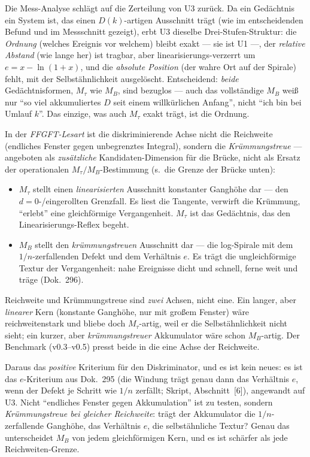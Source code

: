 Die Mess-Analyse schlägt auf die Zerteilung von U3 zurück. Da ein Gedächtnis ein System
ist, das einen $D(k)$-artigen Ausschnitt trägt (wie im entscheidenden Befund und im
Messschnitt gezeigt), erbt U3 dieselbe Drei-Stufen-Struktur: die \emph{Ordnung} (welches
Ereignis vor welchem) bleibt exakt --- sie ist U1 ---, der \emph{relative Abstand} (wie lange
her) ist tragbar, aber linearisierungs-verzerrt um $e=x-\ln(1+x)$, und die \emph{absolute
Position} (der wahre Ort auf der Spirale) fehlt, mit der Selbstähnlichkeit ausgelöscht.
Entscheidend: \emph{beide} Gedächtnisformen, $M_\tau$ wie $M_B$, sind bezuglos --- auch das
vollständige $M_B$ weiß nur \enquote{so viel akkumuliertes $D$ seit einem willkürlichen
Anfang}, nicht \enquote{ich bin bei Umlauf $k$}. Das einzige, was auch $M_\tau$ exakt trägt,
ist die Ordnung.

In der \emph{FFGFT-Lesart} ist die diskriminierende Achse nicht die Reichweite (endliches
Fenster gegen unbegrenztes Integral), sondern die \emph{Krümmungstreue} --- angeboten als
\emph{zusätzliche} Kandidaten-Dimension für die Brücke, nicht als Ersatz der operationalen
$M_\tau/M_B$-Bestimmung (s.\ die Grenze der Brücke unten):
\begin{itemize}
\item $M_\tau$ stellt einen \emph{linearisierten} Ausschnitt konstanter Ganghöhe dar --- den
$d=0$-/eingerollten Grenzfall. Es liest die Tangente, verwirft die Krümmung,
\enquote{erlebt} eine gleichförmige Vergangenheit. $M_\tau$ ist das Gedächtnis, das den
Linearisierungs-Reflex begeht.
\item $M_B$ stellt den \emph{krümmungstreuen} Ausschnitt dar --- die log-Spirale mit dem
$1/n$-zerfallenden Defekt und dem Verhältnis $e$. Es trägt die ungleichförmige Textur der
Vergangenheit: nahe Ereignisse dicht und schnell, ferne weit und träge (Dok.~296).
\end{itemize}

Reichweite und Krümmungstreue sind \emph{zwei} Achsen, nicht eine. Ein langer, aber
\emph{linearer} Kern (konstante Ganghöhe, nur mit großem Fenster) wäre reichweitenstark und
bliebe doch $M_\tau$-artig, weil er die Selbstähnlichkeit nicht sieht; ein kurzer, aber
\emph{krümmungstreuer} Akkumulator wäre schon $M_B$-artig. Der Benchmark (v0.3--v0.5) presst
beide in die eine Achse der Reichweite.

Daraus das \emph{positive} Kriterium für den Diskriminator, und es ist kein neues: es ist das
$e$-Kriterium aus Dok.~295 (die Windung trägt genau dann das Verhältnis $e$, wenn der Defekt
je Schritt wie $1/n$ zerfällt; Skript, Abschnitt~[6]), angewandt auf U3. Nicht
\enquote{endliches Fenster gegen Akkumulation} ist zu testen, sondern \emph{Krümmungstreue
bei gleicher Reichweite}: trägt der Akkumulator die $1/n$-zerfallende Ganghöhe, das
Verhältnis $e$, die selbstähnliche Textur? Genau das unterscheidet $M_B$ von jedem
gleichförmigen Kern, und es ist schärfer als jede Reichweiten-Grenze.

